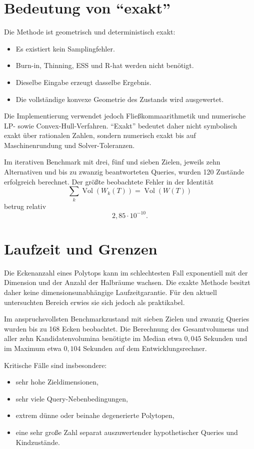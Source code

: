 \documentclass[11pt,a4paper]{article}
\newcommand{\Vol}{\operatorname{Vol}}
\begin{document}
\section{Bedeutung von ``exakt''}

Die Methode ist geometrisch und deterministisch exakt:
\begin{itemize}
  \item Es existiert kein Samplingfehler.
  \item Burn-in, Thinning, ESS und R-hat werden nicht benötigt.
  \item Dieselbe Eingabe erzeugt dasselbe Ergebnis.
  \item Die vollständige konvexe Geometrie des Zustands wird ausgewertet.
\end{itemize}

Die Implementierung verwendet jedoch Fließkommaarithmetik und numerische
LP- sowie Convex-Hull-Verfahren. ``Exakt'' bedeutet daher nicht symbolisch
exakt über rationalen Zahlen, sondern numerisch exakt bis auf
Maschinenrundung und Solver-Toleranzen.

Im iterativen Benchmark mit drei, fünf und sieben Zielen, jeweils zehn
Alternativen und bis zu zwanzig beantworteten Queries, wurden 120 Zustände
erfolgreich berechnet. Der größte beobachtete Fehler in der Identität
\[
  \sum_k\Vol(W_k(T))=\Vol(W(T))
\]
betrug relativ
\[
  2{,}85\cdot 10^{-10}.
\]

\section{Laufzeit und Grenzen}

Die Eckenanzahl eines Polytops kann im schlechtesten Fall exponentiell mit der
Dimension und der Anzahl der Halbräume wachsen. Die exakte Methode besitzt
daher keine dimensionsunabhängige Laufzeitgarantie. Für den aktuell
untersuchten Bereich erwies sie sich jedoch als praktikabel.

Im anspruchsvollsten Benchmarkzustand mit sieben Zielen und zwanzig Queries
wurden bis zu 168 Ecken beobachtet. Die Berechnung des Gesamtvolumens und aller
zehn Kandidatenvolumina benötigte im Median etwa $0{,}045$ Sekunden und im
Maximum etwa $0{,}104$ Sekunden auf dem Entwicklungsrechner.

Kritische Fälle sind insbesondere:
\begin{itemize}
  \item sehr hohe Zieldimensionen,
  \item sehr viele Query-Nebenbedingungen,
  \item extrem dünne oder beinahe degenerierte Polytopen,
  \item eine sehr große Zahl separat auszuwertender hypothetischer Queries und
        Kindzustände.
\end{itemize}
\end{document}
